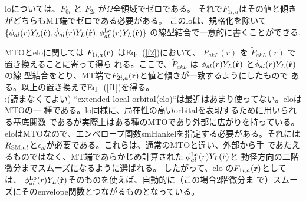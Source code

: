 \documentclass[twocolumn,showpacs,preprintnumbers,amsmath,amssymb,floatfix]{revtex4-1}
\newcommand{\bfr}{{\bf r}}
\newcommand{\refeq}[1]{Eq.~(\ref{#1})}
\newcommand{\req}[1]{\mbox{Eq.~\!(\ref{#1})}}
\def\smh{smHankel}
\def\RSMal{R_{{\rm SM},al}}
\def\epsilonal{\epsilon_{al}}
\def\philo{{\phi}^{\rm Lo}_{al}}
\begin{document}
loについては、$F_{0i}$ と $F_{2i}$ が$\Omega$全領域でゼロである。
それで$F_{1i,a}$はその値と傾きがどちらもMT端でゼロである必要がある。
このloは、規格化を除いて
$\{\phi_{al}(r)Y_L(\hat{\bfr}),\dot{\phi}_{al}(r)Y_L(\hat{\bfr}),\philo(r)Y_L(\hat{\bfr}) \}$
の線型結合で一意的に書くことができる\cite{lo}.

MTOとeloに関しては $F_{1i,a}(\bfr)$ は\refeq{f2}において、
${P}_{akL}(r)$ を $\widetilde{P}_{akL}(r)$ で置き換えることに寄って得ら
れる。ここで、$\widetilde{P}_{akL}$ は
 $\phi_{al}(r)Y_L(\hat{\bfr})$ と$\dot{\phi}_{al}(r)Y_L(\hat{\bfr})$の線
 型結合をとり、MT端で$F_{2i,a}(\bfr)$と値と傾きが一致するようにしたもので
 ある。以上の置き換えで\req{f1}を得る。\\

{\small
{}:(読まなくてよい)
``extended local orbital(elo)``は最近はあまり使ってない。eloはMTOの一
種である。lo同様に、局在性の高いorbitalを表現するために用いられる基底関数
であるが実際上はある種のMTOであり外部に広がりを持っている。
eloはMTOなので、エンベロープ関数\smh を指定する必要がある。それには
$\RSMal$と$\epsilonal$が必要である。これらは、通常のMTOと違い、外部から手
であたえるものではなく、MT端であらかじめ計算された
$\philo(r)Y_L(\hat{\bfr})$と
動径方向の二階微分までスムーズになるように選ばれる。
したがって、elo の$F_{1i,a}(\bfr)$としては、
$\philo(r)Y_L(\hat{\bfr})$そのものを使えば、自動的に（この場合2階微分ま
で）スムーズにそのenvelope関数とつながるものとなっている。
}



\end{document}
